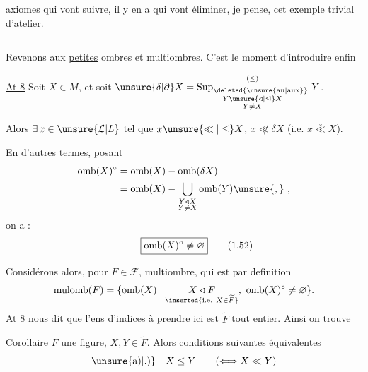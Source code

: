 
axiomes qui vont suivre, il y en a qui vont éliminer, je pense, cet exemple trivial d'atelier.

\par\noindent\hfill\rule{1.4cm}{.3pt}\hfill\mbox{}\par

Revenons aux \uline{petites} ombres et multiombres. C'est le moment d'introduire enfin

\uline{At 8} Soit $X\in M$, et soit $\unsure{\delta|\partial} X=\mathop{\mathrm{Sup}_{\deleted{\unsure{\mathrm{au}|\mathrm{aux}}}}}\limits_{\substack{Y\mathrel{\unsure{\triangleleft|\trianglelefteq}}X\\Y\ne X}}^{(\leq)}\,Y$.

Alors $\exists\,x\in\unsure{\mathcal L|L}$ tel que $x\unsure{\ll|\leq}X$,  $x\mathrel{\not\ll}\delta X$  (i.e. $x\mathrel{\overset{\circ}{\ll}}X$).  

En d'autres termes, posant 
\[
\begin{aligned}
\mathrm{omb}(X)^\circ&=\mathrm{omb}(X)-\mathrm{omb}(\delta X)\\
&=\mathrm{omb}(X)-\bigcup_{\substack{Y\mathrel{\triangleleft} X\\Y\ne X}}\mathrm{omb}(Y)\unsure{,}\ ,
\end{aligned}
\]
on a :
\[
\boxed{\mathrm{omb}(X)^\circ\ne\varnothing}
\tag*{\makebox[0pt][r]{\makebox[\displaywidth][l]{(1.52)}}}
\]

Considérons alors, pour $F\in\mathcal F$,  multiombre, qui est par definition  
\[
\mathrm{mulomb}(F)=\{\mathrm{omb}(X)\mid\underset{\inserted{\text{i.e. }X\in\widetilde F}}{X\mathrel{\triangleleft} F},\ \mathrm{omb}(X)^\circ\ne\varnothing\}.
\]
At 8 nous dit que l'ens d'indices à prendre ici est $\widetilde F$ tout entier. Ainsi on trouve 

\uline{Corollaire}  $F$ une figure, $X,Y\in\widetilde F$. Alors conditions suivantes équivalentes
\[
\unsure{\text{a)}|\text{.)}}\quad X\leq Y\qquad(\Longleftrightarrow X\ll Y)
\]
